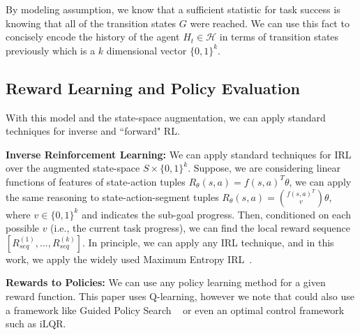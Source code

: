 \documentclass[letterpaper, 10 pt, conference]{ieeeconf}
\newcommand{\hirl}{HIRL\xspace}
\begin{document}
By modeling assumption, we know that a sufficient statistic for task success is knowing that all of the transition states $G$ were reached.
We can use this fact to concisely encode the history of the agent $H_t \in \mathcal{H}$ in terms of transition states previously which is a $k$ dimensional vector $\{0,1\}^k$.


\subsection{Reward Learning and Policy Evaluation}
With this model and the state-space augmentation, we can apply standard techniques for inverse and ``forward" RL.

\vspace{0.5em} \noindent \textbf{Inverse Reinforcement Learning: } We can apply standard techniques for IRL over the augmented state-space $S \times  \{0,1\}^k$. Suppose, we are considering linear functions of features of state-action tuples $R_{\theta}(s,a) = f(s,a)^T\theta$, we can apply the same reasoning to state-action-segment tuples $R_{\theta}(s,a) = \binom{f(s,a)^T}{v}\theta$, where $v \in \{0,1\}^k$ and indicates the sub-goal progress. Then, conditioned on each possible $v$ (i.e., the current task progress), we can find the local reward sequence $[R^{(1)}_{seq},...,R^{(k)}_{seq}]$. 
In principle, we can apply any IRL technique, and in this work, we apply the widely used Maximum Entropy IRL~\cite{DBLP:conf/aaai/ZiebartMBD08}.

\vspace{0.5em} \noindent \textbf{Rewards to Policies: }
We can use any policy learning method for a given reward function. This paper uses Q-learning, however we note that could also use a framework like Guided Policy Search ~\cite{DBLP:journals/corr/LevineFDA15} or even an optimal control framework such as iLQR. 


\end{document}
